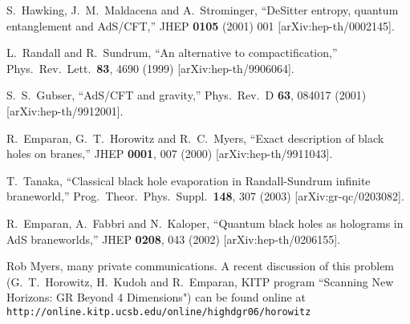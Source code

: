 \documentclass[12pt]{article}
\begin{document}
\begin{thebibliography}{99}
S.~Hawking, J.~M.~Maldacena and A.~Strominger,
  ``DeSitter entropy, quantum entanglement and AdS/CFT,''
  JHEP {\bf 0105} (2001) 001
  [arXiv:hep-th/0002145].


L.~Randall and R.~Sundrum,
  ``An alternative to compactification,''
  Phys.\ Rev.\ Lett.\  {\bf 83}, 4690 (1999)
  [arXiv:hep-th/9906064].

S.~S.~Gubser,
  ``AdS/CFT and gravity,''
  Phys.\ Rev.\ D {\bf 63}, 084017 (2001)
  [arXiv:hep-th/9912001].

R.~Emparan, G.~T.~Horowitz and R.~C.~Myers,
  ``Exact description of black holes on branes,''
  JHEP {\bf 0001}, 007 (2000)
  [arXiv:hep-th/9911043].

T.~Tanaka,
  ``Classical black hole evaporation in Randall-Sundrum infinite  braneworld,''
  Prog.\ Theor.\ Phys.\ Suppl.\  {\bf 148}, 307 (2003)
  [arXiv:gr-qc/0203082].

R.~Emparan, A.~Fabbri and N.~Kaloper,
  ``Quantum black holes as holograms in AdS braneworlds,''
  JHEP {\bf 0208}, 043 (2002)
  [arXiv:hep-th/0206155].

Rob Myers, many private communications. A recent discussion of this
problem (G.~T.~Horowitz, H.~Kudoh and R.~Emparan, KITP program
``Scanning New Horizons: GR Beyond 4 Dimensions") can be found online
at\\ 
\texttt{http://online.kitp.ucsb.edu/online/highdgr06/horowitz}


\end{thebibliography}
\end{document}
